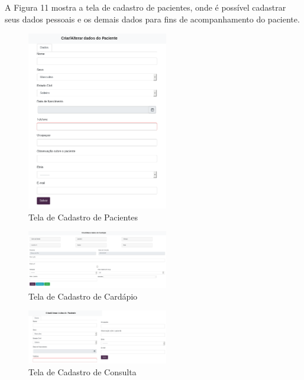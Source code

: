 \documentclass[
	12pt,				%
    oneside,			%
	a4paper,			%
	english,			%
	french,				%
	spanish,			%
	brazil,				%
	]{abntex2}
\begin{document}
A Figura 11 mostra a tela de cadastro de pacientes, onde é possível cadastrar
seus dados pessoais e os demais dados para fins de acompanhamento do paciente. 

\begin{figure} [hbt]
\label{cadastroPac} 
\caption{Tela de Cadastro de Pacientes}
\begin{center}
\includegraphics[width=0.55\textwidth]{cadastroPac1.png}
\end{center}
\end{figure}

\begin{figure} [hbt]
\label{cadastroCard} 
\caption{Tela de Cadastro de Cardápio}
\begin{center}
\includegraphics[width=0.55\textwidth]{cadastroCard.png}
\end{center}
\end{figure}

\begin{figure} [hbt]
\label{cadastroCons} 
\caption{Tela de Cadastro de Consulta}
\begin{center}
\includegraphics[width=0.55\textwidth]{cadastroCons1.png}
\end{center}
\end{figure}
\end{document}
